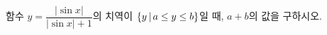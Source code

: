 함수 $y=\dfrac{|\sin x|}{|\sin x|+1}$의 치역이 $\{y\mkern3mu |\mkern3mu a\le y\le b\}$일 때, $a+b$의 값을 구하시오.
